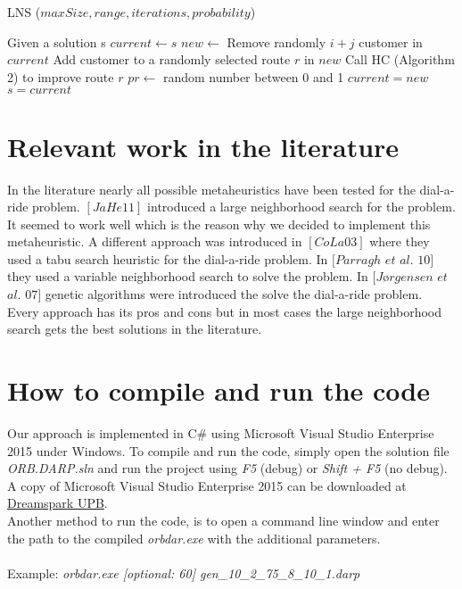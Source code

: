 \documentclass[fleqn]{scrartcl}
\begin{document}
\begin{algorithm}
\caption{LNS ($maxSize, range, iterations, probability$)}
\label{lns}
\begin{algorithmic}[1]
\State Given a solution s
\State $current \gets s$
\State $new \gets$ Remove randomly $i+j$ customer in $current$
\State Add customer to a randomly selected route $r$ in $new$
\State Call HC (Algorithm 2) to improve route $r$
\EndFor
\State $pr \gets$ random number between 0 and 1
\State $current = new$
\State $s = current$
\EndIf
\EndIf
\EndIf
\EndFor
\EndFor
\EndFor
\end{algorithmic}
\end{algorithm}
\newpage
\section{Relevant work in the literature}
In the literature nearly all possible metaheuristics have been tested for the dial-a-ride problem. 
$[JaHe 11]$ introduced a large neighborhood search for the problem. It seemed to work well which is the reason why we decided to implement this metaheuristic. A different approach was introduced in $[CoLa 03]$ where they used a tabu search heuristic for the dial-a-ride problem. In $[Parragh$  $et$  $al.$ $10]$ they used a variable neighborhood search to solve the problem. In $[Jørgensen$ $et$ $al.$ $07]$ genetic algorithms were introduced the solve the dial-a-ride problem.
Every approach has its pros and cons but in most cases the large neighborhood search gets the best solutions in the literature.

\section{How to compile and run the code}
Our approach is implemented in C\# using Microsoft Visual Studio Enterprise 2015 under Windows. To compile and run the code, simply open the solution file \textit{ORB.DARP.sln} and run the project using \textit{F5} (debug) or \textit{Shift + F5} (no debug). A copy of Microsoft Visual Studio Enterprise 2015 can be downloaded at \href{https://dreamspark.uni-paderborn.de/}{Dreamspark UPB}.
\\
Another method to run the code, is to open a command line window and enter the path to the compiled \textit{orbdar.exe} with the additional parameters.
\\\\
Example: \textit{orbdar.exe [optional: 60]  gen\_10\_2\_75\_8\_10\_1.darp}
\newpage
\end{document}
